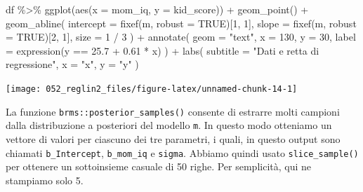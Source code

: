 \documentclass[
  10pt,
  italian,
  a4paper,
  extrafontsizes,onecolumn,openright
  ]{memoir}
\newenvironment{Shaded}{\begin{snugshade}}{\end{snugshade}}
\newcommand{\AttributeTok}[1]{\textcolor[rgb]{0.77,0.63,0.00}{#1}}
\newcommand{\ConstantTok}[1]{\textcolor[rgb]{0.00,0.00,0.00}{#1}}
\newcommand{\DecValTok}[1]{\textcolor[rgb]{0.00,0.00,0.81}{#1}}
\newcommand{\FloatTok}[1]{\textcolor[rgb]{0.00,0.00,0.81}{#1}}
\newcommand{\FunctionTok}[1]{\textcolor[rgb]{0.00,0.00,0.00}{#1}}
\newcommand{\NormalTok}[1]{#1}
\newcommand{\SpecialCharTok}[1]{\textcolor[rgb]{0.00,0.00,0.00}{#1}}
\newcommand{\StringTok}[1]{\textcolor[rgb]{0.31,0.60,0.02}{#1}}
\begin{document}
\begin{Shaded}
\begin{Highlighting}[]
\NormalTok{df }\SpecialCharTok{\%\textgreater{}\%}
  \FunctionTok{ggplot}\NormalTok{(}\FunctionTok{aes}\NormalTok{(}\AttributeTok{x =}\NormalTok{ mom\_iq, }\AttributeTok{y =}\NormalTok{ kid\_score)) }\SpecialCharTok{+}
  \FunctionTok{geom\_point}\NormalTok{() }\SpecialCharTok{+}
  \FunctionTok{geom\_abline}\NormalTok{(}
    \AttributeTok{intercept =} \FunctionTok{fixef}\NormalTok{(m, }\AttributeTok{robust =} \ConstantTok{TRUE}\NormalTok{)[}\DecValTok{1}\NormalTok{, }\DecValTok{1}\NormalTok{],}
    \AttributeTok{slope =} \FunctionTok{fixef}\NormalTok{(m, }\AttributeTok{robust =} \ConstantTok{TRUE}\NormalTok{)[}\DecValTok{2}\NormalTok{, }\DecValTok{1}\NormalTok{],}
    \AttributeTok{size =} \DecValTok{1} \SpecialCharTok{/} \DecValTok{3}
\NormalTok{  ) }\SpecialCharTok{+}
  \FunctionTok{annotate}\NormalTok{(}
    \AttributeTok{geom =} \StringTok{"text"}\NormalTok{,}
    \AttributeTok{x =} \DecValTok{130}\NormalTok{, }\AttributeTok{y =} \DecValTok{30}\NormalTok{,}
    \AttributeTok{label =} \FunctionTok{expression}\NormalTok{(y }\SpecialCharTok{==} \FloatTok{25.7} \SpecialCharTok{+} \FloatTok{0.61} \SpecialCharTok{*}\NormalTok{ x)}
\NormalTok{  ) }\SpecialCharTok{+}
  \FunctionTok{labs}\NormalTok{(}
    \AttributeTok{subtitle =} \StringTok{"Dati e retta di regressione"}\NormalTok{,}
    \AttributeTok{x =} \StringTok{"x"}\NormalTok{,}
    \AttributeTok{y =} \StringTok{"y"}
\NormalTok{  )}
\end{Highlighting}
\end{Shaded}

\begin{center}\texttt{[image: 052\_reglin2\_files/figure-latex/unnamed-chunk-14-1]} \end{center}

La funzione \texttt{brms::posterior\_samples()} consente di estrarre molti campioni dalla distribuzione a posteriori del modello \texttt{m}. In questo modo otteniamo un vettore di valori per ciascuno dei tre parametri, i quali, in questo output sono chiamati \texttt{b\_Intercept}, \texttt{b\_mom\_iq} e \texttt{sigma}. Abbiamo quindi usato \texttt{slice\_sample()} per ottenere un sottoinsieme casuale di 50 righe. Per semplicità, qui ne stampiamo solo 5.
\end{document}
